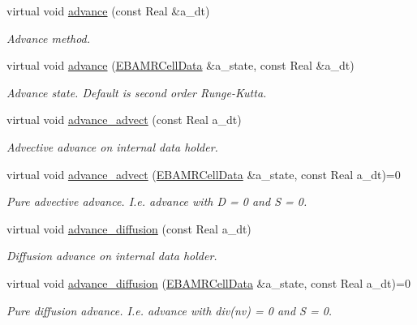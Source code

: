 \begin{DoxyCompactItemize}
virtual void \hyperlink{classcdr__solver_a9482b1635c7907969ad3e6af11bf2687}{advance} (const Real \&a\+\_\+dt)
\begin{DoxyCompactList}\small\item\em Advance method. \end{DoxyCompactList}\item 
virtual void \hyperlink{classcdr__solver_ad41a254af6499c43d7dbcf34b63c2606}{advance} (\hyperlink{type__definitions_8H_a7e610f301989e5e07781c5e338bdb7c3}{E\+B\+A\+M\+R\+Cell\+Data} \&a\+\_\+state, const Real \&a\+\_\+dt)
\begin{DoxyCompactList}\small\item\em Advance state. Default is second order Runge-\/\+Kutta. \end{DoxyCompactList}\item 
virtual void \hyperlink{classcdr__solver_a9435996e15c616c33c53a8bc06f5094a}{advance\+\_\+advect} (const Real a\+\_\+dt)
\begin{DoxyCompactList}\small\item\em Advective advance on internal data holder. \end{DoxyCompactList}\item 
virtual void \hyperlink{classcdr__solver_abb8cb84e1649377889efdb3baa1efb4e}{advance\+\_\+advect} (\hyperlink{type__definitions_8H_a7e610f301989e5e07781c5e338bdb7c3}{E\+B\+A\+M\+R\+Cell\+Data} \&a\+\_\+state, const Real a\+\_\+dt)=0
\begin{DoxyCompactList}\small\item\em Pure advective advance. I.\+e. advance with D = 0 and S = 0. \end{DoxyCompactList}\item 
virtual void \hyperlink{classcdr__solver_ae452b0e9523faa5482ac02ce3abb60c7}{advance\+\_\+diffusion} (const Real a\+\_\+dt)
\begin{DoxyCompactList}\small\item\em Diffusion advance on internal data holder. \end{DoxyCompactList}\item 
virtual void \hyperlink{classcdr__solver_ae6ce5499fc64edf148c37123dfe4da84}{advance\+\_\+diffusion} (\hyperlink{type__definitions_8H_a7e610f301989e5e07781c5e338bdb7c3}{E\+B\+A\+M\+R\+Cell\+Data} \&a\+\_\+state, const Real a\+\_\+dt)=0
\begin{DoxyCompactList}\small\item\em Pure diffusion advance. I.\+e. advance with div(nv) = 0 and S = 0. \end{DoxyCompactList}\item 

\end{DoxyCompactItemize}
